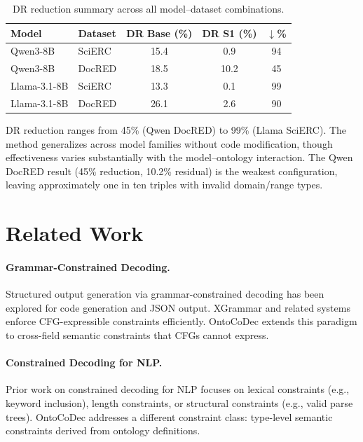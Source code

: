 \documentclass[11pt,a4paper]{article}
\newcommand{\method}{OntoCoDec}
\begin{document}
\begin{table}[t]
\centering
\small
\caption{DR reduction summary across all model--dataset combinations.}
\label{tab:dr_summary}
\begin{tabular}{llccc}
\toprule
\textbf{Model} & \textbf{Dataset} & \textbf{DR Base (\%)} & \textbf{DR S1 (\%)} & \textbf{$\downarrow$\%} \\
\midrule
Qwen3-8B & SciERC & 15.4 & 0.9 & 94 \\
Qwen3-8B & DocRED & 18.5 & 10.2 & 45 \\
Llama-3.1-8B & SciERC & 13.3 & 0.1 & 99 \\
Llama-3.1-8B & DocRED & 26.1 & 2.6 & 90 \\
\bottomrule
\end{tabular}
\end{table}

DR reduction ranges from 45\% (Qwen DocRED) to 99\% (Llama SciERC). The method generalizes across model families without code modification, though effectiveness varies substantially with the model--ontology interaction. The Qwen DocRED result (45\% reduction, 10.2\% residual) is the weakest configuration, leaving approximately one in ten triples with invalid domain/range types.

\section{Related Work}
\label{sec:related}

\paragraph{Grammar-Constrained Decoding.}
Structured output generation via grammar-constrained decoding has been explored for code generation and JSON output. XGrammar and related systems enforce CFG-expressible constraints efficiently. \method{} extends this paradigm to cross-field semantic constraints that CFGs cannot express.

\paragraph{Constrained Decoding for NLP.}
Prior work on constrained decoding for NLP focuses on lexical constraints (e.g., keyword inclusion), length constraints, or structural constraints (e.g., valid parse trees). \method{} addresses a different constraint class: type-level semantic constraints derived from ontology definitions.
\end{document}
